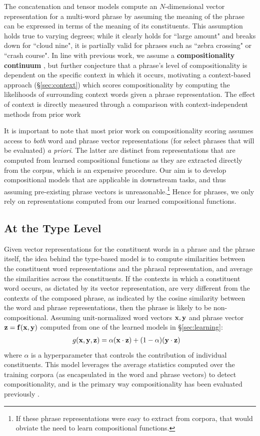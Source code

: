 \documentclass[11pt]{article}
\newcommand{\bX}{{\bf x}}
\newcommand{\bY}{{\bf y}}
\newcommand{\bZ}{{\bf z}}
\newcommand{\bF}{{\bf f}}
\begin{document}
The concatenation and tensor models compute an $N$-dimensional vector representation for a multi-word phrase by assuming the meaning of the phrase can be expressed in terms of the meaning of its constituents. 
This assumption holds true to varying degrees; while it clearly holds for ``large amount" and breaks down for ``cloud nine", it is partially valid for phrases such as ``zebra crossing" or ``crash course". 
In line with previous work, we assume a {\bf compositionality continuum} \cite{McCarthy2003}, but further conjecture that a phrase's level of compositionality is dependent on the specific context in which it occurs,  motivating a context-based approach (\S\ref{sec:context}) which scores compositionality by computing the likelihoods of surrounding context words given a phrase representation. 
The effect of context is directly measured through a comparison with context-independent methods from prior work \cite{Bannard2003,Reddy2011}

It is important to note that most prior work on compositionality scoring assumes access to \emph{both} word and phrase vector representations (for select phrases that will be evaluated) \emph{a priori}.  
The latter are distinct from representations that are computed from learned compositional functions as they are extracted directly from the corpus, which is an expensive procedure. 
Our aim is to develop compositional models that are applicable in downstream tasks, and thus assuming pre-existing phrase vectors is unreasonable.\footnote{If these phrase representations were easy to extract from corpora, that would obviate the need to learn compositional functions.}
Hence for phrases, we only rely on representations computed from our learned compositional functions. 

\subsection{At the Type Level}
\label{sec:independent}

Given vector representations for the constituent words in a phrase and the phrase itself, the idea behind the type-based model is to compute similarities between the constituent word representations and the phrasal representation, and average the similarities across the constituents. 
If the contexts in which a constituent word occurs, as dictated by its vector representation, are very different from the contexts of the composed phrase, as indicated by the cosine similarity between the word and phrase representations, then the phrase is likely to be non-compositional. 
Assuming unit-normalized word vectors $\bX, \bY$ and phrase vector $\bZ = \bF(\bX, \bY)$ computed from one of the learned models in \S\ref{sec:learning}:
\begin{align}
	g(\bX, \bY, \bZ) &= \alpha (\bX \cdot \bZ) + (1-\alpha)(\bY \cdot \bZ)
	\label{eq:cosine-sim}
\end{align}
where $\alpha$ is a hyperparameter that controls the contribution of individual constituents. 
This model leverages the average statistics computed over the training corpora (as encapsulated in the word and phrase vectors) to detect compositionality, and is the primary way compositionality has been evaluated previously \cite{Reddy2011,Kiela2013}. 
\end{document}
